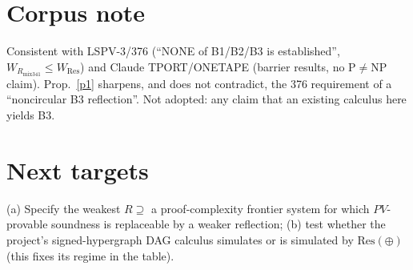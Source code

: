 \documentclass[11pt]{article}
\theoremstyle{remark}
\begin{document}
\section*{Corpus note}
Consistent with LSPV-3/376 (``NONE of B1/B2/B3 is established'', $W_{R_{\mathrm{mix341}}}\le W_{\mathrm{Res}}$) and Claude TPORT/ONETAPE (barrier results, no P$\ne$NP claim). Prop.~\ref{p1} sharpens, and does not contradict, the 376 requirement of a ``noncircular B3 reflection''. Not adopted: any claim that an existing calculus here yields B3.

\section*{Next targets}
(a) Specify the weakest $R\supseteq$ a proof-complexity frontier system for which $PV$-provable soundness is replaceable by a weaker reflection; (b) test whether the project's signed-hypergraph DAG calculus simulates or is simulated by $\mathrm{Res}(\oplus)$ (this fixes its regime in the table).
\end{document}
